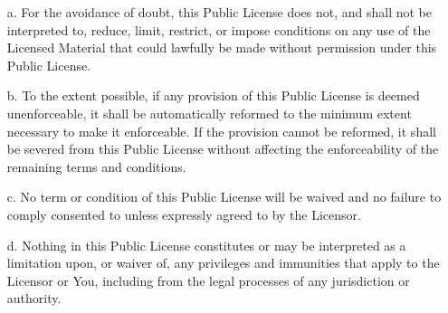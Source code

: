 \begin{itemize}
    \item[a.] For the avoidance of doubt, this Public License does not, and shall not be interpreted to, reduce, limit, restrict, or impose conditions on any use of the Licensed Material that could lawfully be made without permission under this Public License.
    \item[b.] To the extent possible, if any provision of this Public License is deemed unenforceable, it shall be automatically reformed to the minimum extent necessary to make it enforceable. If the provision cannot be reformed, it shall be severed from this Public License without affecting the enforceability of the remaining terms and conditions.
    \item[c.] No term or condition of this Public License will be waived and no failure to comply consented to unless expressly agreed to by the Licensor.
    \item[d.] Nothing in this Public License constitutes or may be interpreted as a limitation upon, or waiver of, any privileges and immunities that apply to the Licensor or You, including from the legal processes of any jurisdiction or authority.
\end{itemize}


